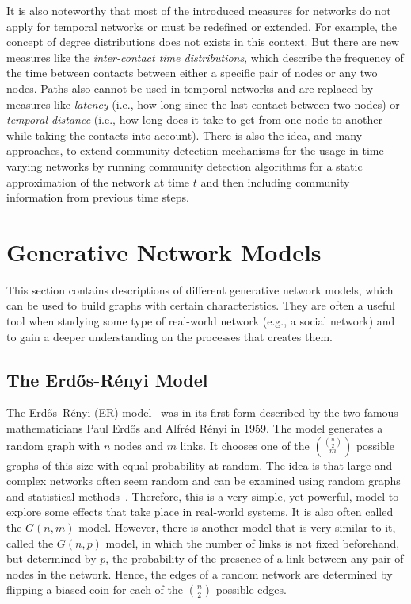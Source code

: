 It is also noteworthy that most of the introduced measures for networks do not apply for temporal networks or must be redefined or extended.
For example, the concept of degree distributions does not exists in this context.
But there are new measures like the \emph{inter-contact time distributions}, which describe the frequency of the time between contacts between either a specific pair of nodes or any two nodes.
Paths also cannot be used in temporal networks and are replaced by measures like \emph{latency} (i.e., how long since the last contact between two nodes) or \emph{temporal distance} (i.e., how long does it take to get from one node to another while taking the contacts into account).
There is also the idea, and many approaches, to extend community detection mechanisms for the usage in time-varying networks by running community detection algorithms for a static approximation of the network at time \(t\) and then including community information from previous time steps.




\section{Generative Network Models}
\label{sec:network-models}

This section contains descriptions of different generative network models, which can be used to build graphs with certain characteristics.
They are often a useful tool when studying some type of real-world network (e.g., a social network) and to gain a deeper understanding on the processes that creates them.


\subsection{The Erdős-Rényi Model}
\label{subsec:erdos-reni-model}

The Erdős–Rényi (ER) model~\cite{Erdos1959, Newman2010} was in its first form described by the two famous mathematicians Paul Erdős and Alfréd Rényi in 1959.
The model generates a random graph with \(n\) nodes and \(m\) links.
It chooses one of the \(\binom{\binom{n}{2}}{m}\) possible graphs of this size with equal probability at random.
The idea is that large and complex networks often seem random and can be examined using random graphs and statistical methods~\cite{Barabasi2002}.
Therefore, this is a very simple, yet powerful, model to explore some effects that take place in real-world systems.
It is also often called the \( G(n, m) \) model.
However, there is another model that is very similar to it, called the \(G(n, p)\) model, in which the number of links is not fixed beforehand, but determined by \(p\), the probability of the presence of a link between any pair of nodes in the network.
Hence, the edges of a random network are determined by flipping a biased coin for each of the \(\binom{n}{2}\) possible edges.

